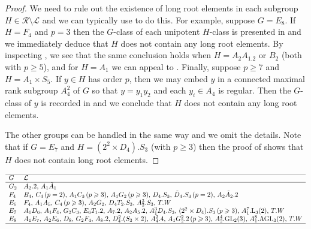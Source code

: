 \documentclass[twoside,a4paper,reqno,11pt]{amsart}
\newcommand{\<}{\langle}
\renewcommand{\>}{\rangle}
\newcommand{\geqs}{\geqslant}
\renewcommand{\:}{\colon}
\theoremstyle{plain}
\theoremstyle{definition}
\begin{document}
\begin{proof}
We need to rule out the existence of long root elements in each subgroup $H \in \mathcal{R} \setminus \mathcal{L}$ and we can typically use \cite{Law2} to do this. For example, suppose $G = E_8$. If $H = F_4$ and $p=3$ then the $G$-class of each unipotent $H$-class is presented in \cite[Table 2]{CST} and we immediately deduce that $H$ does not contain any long root elements. By inspecting \cite[Tables 36, 37]{Law2}, we see that the same conclusion holds when $H = A_2A_1.2$ or $B_2$ (both with $p \geqs 5$), and for $H = A_1$ we can appeal to \cite[Table 27]{Law2}. Finally, suppose $p \geqs 7$ and $H = A_1 \times S_5$. If $y \in H$ has order $p$, then we may embed $y$ in a connected maximal rank subgroup $A_4^2$ of $G$ so that $y = y_1y_2$ and each $y_i \in A_4$ is regular. Then the $G$-class of $y$ is recorded in \cite[Table 26]{Law2} and we conclude that $H$ does not contain any long root elements.  

The other groups can be handled in the same way and we omit the details. Note that if $G = E_7$ and $H = (2^2 \times D_4).S_3$ (with $p \geqs 3$) then the proof of \cite[Proposition 5.12]{BGS} shows that $H$ does not contain long root elements. 
\end{proof}

\renewcommand{\arraystretch}{1.2}
{\small
\begin{table}
\[
\begin{array}{ll} \hline
G & \mathcal{L} \\ \hline
G_2 & A_2.2, \,  A_1\tilde{A}_1 \\
F_4 & B_4, \, C_4 \, (p=2), \, A_1C_3 \, (p \geqs 3), \, A_1G_2 \, (p \geqs 3), \, D_4.S_3, \, \tilde{D}_4.S_3 \, (p=2), \, A_2\tilde{A}_2.2 \\ 
E_6 & F_4, \, A_1A_5, \, C_4 \, (p \geqs 3), \, A_2G_2, \, D_4T_2.S_3,\, A_2^3.S_3, \, T.W \\
E_7 & A_1D_6, \, A_1F_4, \, G_2C_3, \, E_6T_1.2, \, A_7.2,\, A_2A_5.2,\, A_1^3D_4.S_3, \, (2^2 \times D_4).S_3 \, (p \geqs 3), \, A_1^7.{\rm L}_3(2), \, T.W \\ 
E_8 & A_1E_7, \, A_2E_6, \, D_8, \, G_2F_4, \, A_8.2, \, D_4^2.(S_3 \times 2),\, A_4^2.4, \, A_1G_2^2.2 \, (p \geqs 3), \,  A_2^4.{\rm GL}_2(3), \, A_1^8.{\rm AGL}_3(2),\, T.W  \\ \hline
\end{array}
\]
\caption{The subgroup collection $\mathcal{L}$ in Theorem \ref{t:long}}
\label{tab:long}
\end{table}}
\renewcommand{\arraystretch}{1}
 
\end{document}
